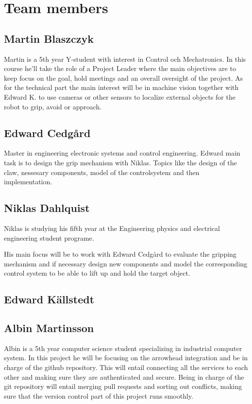 \section{Team members}

\subsection{Martin Blaszczyk}
Martin is a 5th year Y-student with interest in Control och Mechatronics. 
In this course he'll take the role of a Project Leader where the main objectives
are to keep focus on the goal, hold meetings and an overall oversight of the project. 
As for the technical part the main interest will be in machine vision together with
Edward K. to use cameras or other sensors to localize external objects for the 
robot to grip, avoid or approach. 

\subsection{Edward Cedgård}
Master in engineering electronic systems and control engineering.
Edward main task is to design the grip mechanism with Niklas. Topics like
the design of the claw, nessesary components, model of the controlsystem and then implementation. 

\subsection{Niklas Dahlquist}
Niklas is studying his fifth year at the Engineering physics and electrical engineering student programe.

His main focus will be to work with Edward Cedgård to evaluate the gripping mechanism and if necessary design new components and model the corresponding control system to be able to lift up and hold the target object.

\subsection{Edward Källstedt}

\subsection{Albin Martinsson}
Albin is a 5th year computer science student specializing in industrial computer system. In this project he will be focusing on the 
arrowhead integration and be in charge of the github repository. This will entail connecting all the services to each other and
making sure they are authenticated and secure. Being in charge of the git repository will entail merging pull requests and sorting
out conflicts, making sure that the version control part of this project runs smoothly.

